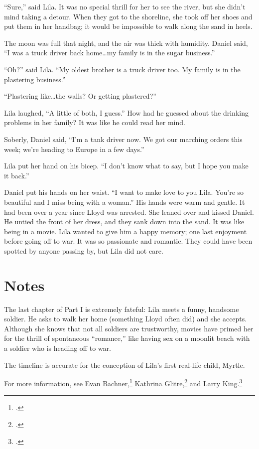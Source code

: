 \documentclass[
  american,
  letterpaper,
]{book}
\begin{document}
``Sure,'' said Lila. It was no special thrill for her to see the river,
but she didn't mind taking a detour. When they got to the shoreline, she
took off her shoes and put them in her handbag; it would be impossible
to walk along the sand in heels.

The moon was full that night, and the air was thick with humidity.
Daniel said, ``I was a truck driver back home\ldots my family is in the
sugar business.''

``Oh?'' said Lila. ``My oldest brother is a truck driver too. My family
is in the plastering business.''

``Plastering like\ldots the walls? Or getting plastered?''

Lila laughed, ``A little of both, I guess.'' How had he guessed about
the drinking problems in her family? It was like he could read her mind.

Soberly, Daniel said, ``I'm a tank driver now. We got our marching
orders this week; we're heading to Europe in a few days.''

Lila put her hand on his bicep. ``I don't know what to say, but I hope
you make it back.''

Daniel put his hands on her waist. ``I want to make love to you Lila.
You're so beautiful and I miss being with a woman.'' His hands were warm
and gentle. It had been over a year since Lloyd was arrested. She leaned
over and kissed Daniel. He untied the front of her dress, and they sank
down into the sand. It was like being in a movie. Lila wanted to give
him a happy memory; one last enjoyment before going off to war. It was
so passionate and romantic. They could have been spotted by anyone
passing by, but Lila did not care.

\section{Notes}\label{notes-30}

The last chapter of Part I is extremely fateful: Lila meets a funny,
handsome soldier. He asks to walk her home (something Lloyd often did)
and she accepts. Although she knows that not all soldiers are
trustworthy, movies have primed her for the thrill of spontaneous
``romance,'' like having sex on a moonlit beach with a soldier who is
heading off to war.

The timeline is accurate for the conception of Lila's first real-life
child, Myrtle.

For more information, see Evan Bachner,\footnote{.}
Kathrina Glitre,\footnote{.} and Larry King.\footnote{.}
\end{document}
